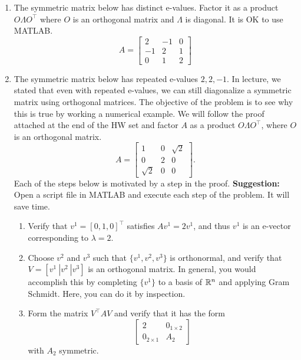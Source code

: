 \documentclass[letterpaper]{article}
\begin{document}
\begin{enumerate}


\item The symmetric matrix below has distinct e-values.
Factor it as a product $O \Lambda O^\top$ where $O$ is an orthogonal matrix and $\Lambda$ is diagonal. It is OK to use MATLAB.
    $$A= \left[ \begin{array}{rrr} 2 &-1& 0 \\-1 &2 &1\\ 0& 1 &2 \end{array} \right]$$


\item The symmetric matrix below has repeated e-values $2,2,-1$. In lecture, we stated that even with repeated e-values, we can still
diagonalize a symmetric matrix using orthogonal matrices. The objective of the problem is to see why this is true by working a numerical example. We will
 follow the proof attached at the end of the HW set and factor $A$ as a product $O \Lambda O^\top$, where $O$ is an orthogonal matrix.
    $$A=  \left[ \begin{array}{rrr} 1 &0& \sqrt{2} \\0 &2 &0\\ \sqrt{2} &0 &0\end{array} \right].$$
    Each of the steps below is motivated by a step in the proof. \textbf{Suggestion:} Open a script file in MATLAB and execute each step of the problem. It will save time.

        \begin{enumerate}
\setlength{\itemsep}{.1in}
\renewcommand{\labelenumi}{(\alph{enumi})}

\item  Verify that $v^1=[0, 1, 0]^\top$ satisfies $A  v^1 = 2 v^1$, and thus $v^1$ is an e-vector corresponding to $\lambda = 2$.

 \item Choose $v^2$ and $v^3$ such that $\{ v^1, v^2, v^3 \}$ is orthonormal, and verify that $V=[v^1~| v^2~| v^3 ]$ is an orthogonal matrix. In general,
 you would accomplish this by completing $\{v^1\}$ to a basis of $\mathbb R^n$ and applying Gram Schmidt. Here, you can do it by inspection.

 \item  Form the matrix $V^\top A V$ and verify that it has the form $$  \left[ \begin{array}{cc} 2 &0_{1\times2} \\ 0_{2 \times 1} &A_2 \end{array} \right]$$
 with $A_2$ symmetric.


\end{enumerate}
\end{enumerate}
\end{document}
